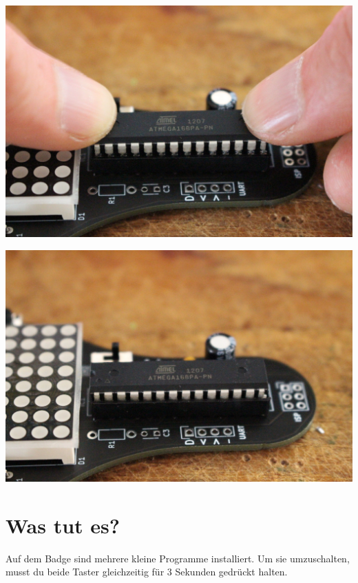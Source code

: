 \documentclass{article}
\begin{document}
\vspace{0.5cm}

\begin{minipage}[b]{0.5\textwidth}
	\includegraphics[width=\textwidth]{Bilder2022/IMG_8241.JPG}
\end{minipage}
\begin{minipage}[b]{0.5\textwidth}
	\includegraphics[width=\textwidth]{Bilder2022/IMG_8242.JPG}
\end{minipage}

\vspace{0.5cm}


\section{Was tut es?}

Auf dem Badge sind mehrere kleine Programme installiert. Um sie umzuschalten, musst du beide Taster gleichzeitig für 3 Sekunden gedrückt halten.\\
\end{document}
